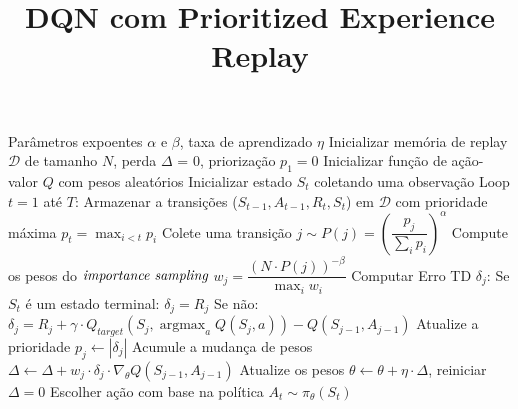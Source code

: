 \documentclass[brazilian,preview]{standalone}
\title{DQN com Prioritized Experience Replay}
\begin{document}
\begin{algorithm}
Parâmetros expoentes $\alpha$ e $\beta$, taxa de aprendizado $\eta$
Inicializar memória de replay $\mathcal{D}$ de tamanho $N$, perda $\Delta$ = 0, priorização $p_1 = 0$
Inicializar função de ação-valor $Q$ com pesos aleatórios
Inicializar estado $S_t$ coletando uma observação
Loop $t = 1$ até $T$:
    Armazenar a transições ($S_{t-1},A_{t-1},R_t,S_t$) em $\mathcal{D}$ com prioridade máxima $p_t = \operatorname{max}_{i<t}p_i$
    Colete uma transição $j \sim P(j) = (\dfrac{p_j}{\sum_i p_i})^\alpha$
    Compute os pesos do $\emph{importance sampling}$ $w_j = \dfrac{(N \cdot P(j))^{-\beta}}{\operatorname{max}_i w_i}$ 
    Computar Erro TD $\delta_j$:
    Se $S_t$ é um estado terminal:
        $\delta_j = R_j$
    Se não:
        $\delta_j = R_j+ \gamma \cdot Q_{target}(S_j, \operatorname{argmax}_aQ(S_j,a)) - Q(S_{j-1}, A_{j-1})$
    Atualize a prioridade $p_j \leftarrow |\delta_j|$
    Acumule a mudança de pesos $\Delta \leftarrow \Delta + w_j \cdot \delta_j \cdot \nabla_{\theta}Q(S_{j-1},A_{j-1})$
    Atualize os pesos $\theta \leftarrow \theta + \eta \cdot \Delta$, reiniciar $\Delta = 0$
    Escolher ação com base na política $A_t \sim \pi_{\theta}(S_t) $
\end{algorithm}
\end{document}

